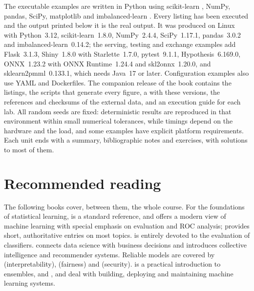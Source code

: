 The executable examples are written in Python using \textsf{scikit-learn} \citep{pedregosa2011scikit},
\textsf{NumPy}, \textsf{pandas}, \textsf{SciPy}, \textsf{matplotlib} and
\textsf{imbalanced-learn} \citep{lemaitre2017imbalanced}. Every listing has been executed and
the output printed below it is the real output. It was produced on Linux with Python~3.12, \textsf{scikit-learn}~1.8.0,
\textsf{NumPy}~2.4.4, \textsf{SciPy}~1.17.1, \textsf{pandas}~3.0.2 and \textsf{imbalanced-learn}~0.14.2; the serving,
testing and exchange examples add \textsf{Flask}~3.1.3, \textsf{Shiny}~1.8.0 with \textsf{Starlette}~1.7.0,
\textsf{pytest}~9.1.1, \textsf{Hypothesis}~6.169.0, \textsf{ONNX}~1.23.2 with \textsf{ONNX Runtime}~1.24.4 and
\textsf{skl2onnx}~1.20.0, and \textsf{sklearn2pmml}~0.133.1, which needs Java~17 or later. Configuration examples also use
YAML and Dockerfiles. The companion release of the book\edmcompanionref{} contains the listings, the scripts that generate
every figure, a  with these versions, the references and checksums of the external data, and an
execution guide for each lab. All random seeds are fixed: deterministic results are reproduced in that environment within
small numerical tolerances, while timings depend on the hardware and the load, and some examples have explicit platform
requirements. Each unit ends with a summary, bibliographic notes and exercises,
with solutions to most of them.

\section*{Recommended reading}

The following books cover, between them, the whole course. For the foundations of
statistical learning, \citet{hastie2009elements} is a standard reference, and
\citet{flach2012machine} offers a modern view of machine learning with special emphasis on
evaluation and ROC analysis; \citet{sammut2010encyclopedia} provides short, authoritative
entries on most topics. \citet{japkowicz2011evaluating} is entirely devoted to the evaluation
of classifiers. \citet{provost2013data} connects data science with business decisions and
\citet{segaran2007programming} introduces collective intelligence and recommender systems.
Reliable models are covered by \citet{molnar2022interpretable} (interpretability),
\citet{barocas2023fairness} (fairness) and \citet{chio2018machine} (security).
\citet{kyriakides2019hands} is a practical introduction to ensembles, and
\citet{ameisen2020building}, \citet{kelleher2019machine} and \citet{burkov2020machine} deal
with building, deploying and maintaining machine learning systems.

\bigskip
